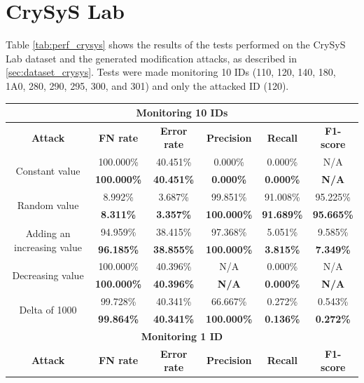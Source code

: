 \section{CrySyS Lab}

Table \ref{tab:perf_crysys} shows the results of the tests performed on the CrySyS Lab dataset and the generated modification attacks, as described in \ref{sec:dataset_crysys}. Tests were made monitoring 10 IDs (110, 120, 140, 180, 1A0, 280, 290, 295, 300, and 301) and only the attacked ID (120).

\begin{table}
    \centering
    \begin{tabular}{*{6}{c}}
        \toprule 
        \multicolumn{6}{c}{\textbf{Monitoring 10 IDs}}\\
        \midrule
        \textbf{Attack} & \textbf{FN rate} & \textbf{Error rate} & \textbf{Precision} & \textbf{Recall} & \textbf{F1-score}\\
        \midrule
        \multirow{2}{*}{Constant value} & 100.000\% & 40.451\% & 0.000\% & 0.000\% & N/A\\
        & \textbf{100.000\%} & \textbf{40.451\%} & \textbf{0.000\%} & \textbf{0.000\%} & \textbf{N/A}\\
        \multirow{2}{*}{Random value} & 8.992\% & 3.687\% & 99.851\% & 91.008\% & 95.225\%\\
        & \textbf{8.311\%} & \textbf{3.357\%} & \textbf{100.000\%} & \textbf{91.689\%} & \textbf{95.665\%}\\
        \multirow{2}{*}{Adding an increasing value} & 94.959\% & 38.415\% & 97.368\% & 5.051\% & 9.585\%\\
        & \textbf{96.185\%} & \textbf{38.855\%} & \textbf{100.000\%} & \textbf{3.815\%} & \textbf{7.349\%}\\
        \multirow{2}{*}{Decreasing value} & 100.000\% & 40.396\% & N/A & 0.000\% & N/A\\
        & \textbf{100.000\%} & \textbf{40.396\%} & \textbf{N/A} & \textbf{0.000\%} & \textbf{N/A}\\
        \multirow{2}{*}{Delta of 1000} & 99.728\% & 40.341\% & 66.667\% & 0.272\% & 0.543\%\\
        & \textbf{99.864\%} & \textbf{40.341\%} & \textbf{100.000\%} & \textbf{0.136\%} & \textbf{0.272\%}\\
        \bottomrule
        \toprule
        \multicolumn{6}{c}{\textbf{Monitoring 1 ID}}\\
        \midrule
        \textbf{Attack} & \textbf{FN rate} & \textbf{Error rate} & \textbf{Precision} & \textbf{Recall} & \textbf{F1-score}\\

\end{tabular}
\end{table}
